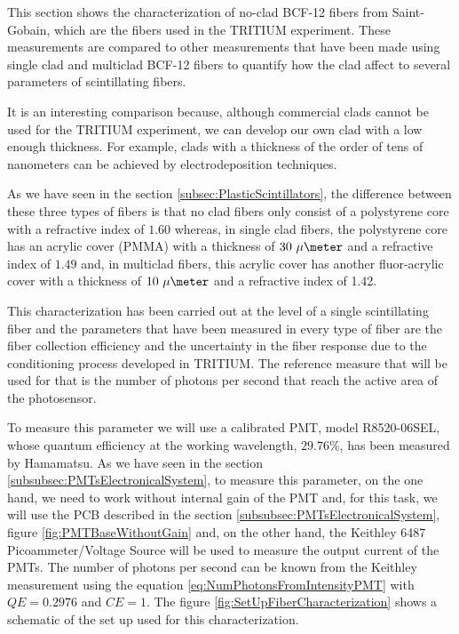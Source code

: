 This section shows the characterization of no-clad BCF-12 fibers from Saint-Gobain, which are the fibers used in the TRITIUM experiment. These measurements are compared to other measurements that have been made using single clad and multiclad BCF-12 fibers to quantify how the clad affect to several parameters of scintillating fibers.

It is an interesting comparison because, although commercial clads cannot be used for the TRITIUM experiment, we can develop our own clad with a low enough thickness. For example, clads with a thickness of the order of tens of nanometers can be achieved by electrodeposition techniques.

As we have seen in the section \ref{subsec:PlasticScintillators}, the difference between these three types of fibers is that no clad fibers only consist of a polystyrene core with a refractive index of $1.60$ whereas, in single clad fibers, the polystyrene core has an acrylic cover (PMMA) with a thickness of $30~\mu\meter$ and a refractive index of $1.49$ and, in multiclad fibers, this acrylic cover has another fluor-acrylic cover with a thickness of $10~\mu\meter$ and a refractive index of 1.42.




This characterization has been carried out at the level of a single scintillating fiber and the parameters that have been measured in every type of fiber are the fiber collection efficiency and the uncertainty in the fiber response due to the conditioning process developed in TRITIUM. The reference measure that will be used for that is the number of photons per second that reach the active area of the photosensor.

To measure this parameter we will use a calibrated PMT, model R8520-06SEL, whose quantum efficiency at the working wavelength, $29.76\%$, has been measured by Hamamatsu. As we have seen in the section \ref{subsubsec:PMTsElectronicalSystem}, to measure this parameter, on the one hand, we need to work without internal gain of the PMT and, for this task, we will use the PCB described in the section \ref{subsubsec:PMTsElectronicalSystem}, figure \ref{fig:PMTBaseWithoutGain} and, on the other hand, the Keithley 6487 Picoammeter/Voltage Source will be used to measure the output current of the PMTs. The number of photons per second can be known from the Keithley measurement using the equation \ref{eq:NumPhotonsFromIntensityPMT} with $QE=0.2976$ and $CE=1$. The figure \ref{fig:SetUpFiberCharacterization} shows a schematic of the set up used for this characterization.

